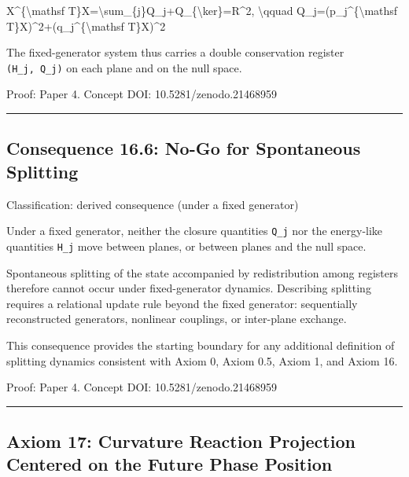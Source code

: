 \documentclass[
  a4paper,
]{article}
\newenvironment{Shaded}{}{}
\newcommand{\NormalTok}[1]{#1}
\begin{document}
\begin{Shaded}
\begin{Highlighting}[]
\NormalTok{X\^{}\{\textbackslash{}mathsf T\}X=\textbackslash{}sum\_\{j\}Q\_j+Q\_\{\textbackslash{}ker\}=R\^{}2,}
\NormalTok{\textbackslash{}qquad}
\NormalTok{Q\_j=(p\_j\^{}\{\textbackslash{}mathsf T\}X)\^{}2+(q\_j\^{}\{\textbackslash{}mathsf T\}X)\^{}2}
\end{Highlighting}
\end{Shaded}

The fixed-generator system thus carries a double conservation register
\texttt{(H\_j,\ Q\_j)} on each plane and on the null space.

Proof: Paper 4. Concept DOI: 10.5281/zenodo.21468959

\begin{center}\rule{0.5\linewidth}{0.5pt}\end{center}

\subsection{Consequence 16.6: No-Go for Spontaneous
Splitting}\label{consequence-16.6-no-go-for-spontaneous-splitting}

Classification: derived consequence (under a fixed generator)

Under a fixed generator, neither the closure quantities \texttt{Q\_j}
nor the energy-like quantities \texttt{H\_j} move between planes, or
between planes and the null space.

Spontaneous splitting of the state accompanied by redistribution among
registers therefore cannot occur under fixed-generator dynamics.
Describing splitting requires a relational update rule beyond the fixed
generator: sequentially reconstructed generators, nonlinear couplings,
or inter-plane exchange.

This consequence provides the starting boundary for any additional
definition of splitting dynamics consistent with Axiom 0, Axiom 0.5,
Axiom 1, and Axiom 16.

Proof: Paper 4. Concept DOI: 10.5281/zenodo.21468959

\begin{center}\rule{0.5\linewidth}{0.5pt}\end{center}

\subsection{Axiom 17: Curvature Reaction Projection Centered on the
Future Phase
Position}\label{axiom-17-curvature-reaction-projection-centered-on-the-future-phase-position}
\end{document}
